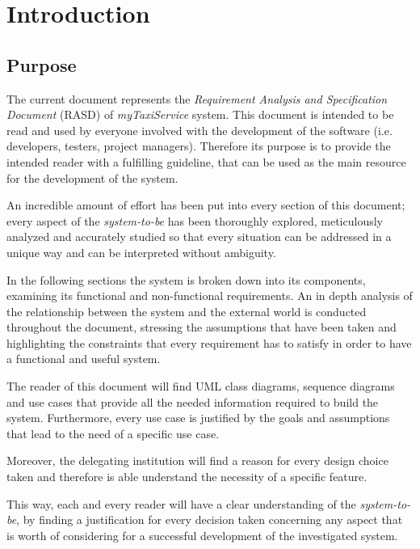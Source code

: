 \section{Introduction}

\subsection{Purpose}

The current document represents the \emph{Requirement Analysis and Specification Document} (RASD) of \emph{myTaxiService} system.
This document is intended to be read and used by everyone involved with the development of the software (i.e. developers, testers, project managers). Therefore its purpose is to provide the intended reader with a fulfilling guideline, that can be used as the main resource for the development of the system.


An incredible amount of effort has been put into every section of this document; every aspect of the \emph{system-to-be} has been thoroughly explored, meticulously analyzed and accurately studied so that every situation can be addressed in a unique way and can be interpreted without ambiguity.

In the following sections the system is broken down into its components, examining its functional and non-functional requirements. An in depth analysis of the relationship between the system and the external world is conducted throughout the document, stressing the assumptions that have been taken and highlighting the constraints that every requirement has to satisfy in order to have a functional and useful system.


The reader of this document will find UML class diagrams, sequence diagrams and use cases that provide all the needed information required to build the system.
Furthermore, every use case is justified by the goals and assumptions that lead to the need of a specific use case.

Moreover, the delegating institution will find a reason for every design choice taken and therefore is able understand the necessity of a specific feature.

This way, each and every reader will have a clear understanding of the \emph{system-to-be}, by finding a justification for every decision taken concerning any aspect that is worth of considering for a successful development of the investigated system.


